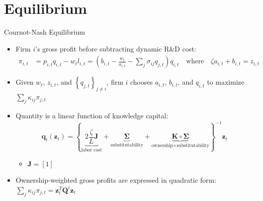 \documentclass[
  aspectratio=169,  %
]{beamer}
\theoremstyle{plain}
\begin{document}
\section{Equilibrium}

\begin{frame}{Cournot-Nash Equilibrium}
  \begin{itemize}
    \item \label{cournot}Firm $i$'s gross profit before subtracting dynamic
          R\&D cost:
          \begin{align*}
            \pi_{i,t} & =p_{i,t}q_{i,t}-w_{t}l_{i,t}=\left(b_{i,t}-\frac{w_{t}}{a_{i,t}}-\sum_{j}\sigma_{ij}q_{j,t}\right)q_{i,t}\quad\text{where}\quad\zeta a_{i,t}+b_{i,t}=z_{i,t}
          \end{align*}
    \item Given $w_{t}$, $z_{i,t}$, and $\left\{ q_{j,t}\right\} _{j\neq i}$,
          firm $i$ chooses $a_{i,t}$, $b_{i,t}$, and $q_{i,t}$ to maximize
          $\sum_{j}\kappa_{ij}\pi_{j,t}$\pause\medskip{}
    \item Quantity is a linear function of knowledge capital:
          \[
            \symbf{q}_{t}(\symbf{z}_{t})=\left\{ \underbrace{2\frac{\zeta}{L}\symbf{J}}_{\text{labor cost}}+\underbrace{\symbf{\Sigma}}_{\text{substitutability}}+\underbrace{\symbf{K}\circ\symbf{\Sigma}}_{\text{ownership}\times\text{substitutability}}\right\} ^{-1}\symbf{z}_{t}
          \]

          \begin{itemize}
            \item $\symbf{J}=[1]$ \medskip{}
          \end{itemize}
    \item Ownership-weighted gross profits are expressed in quadratic form:
          $\sum_{j}\kappa_{ij}\pi_{j,t}=\symbf{z}_{t}^{T}\symbf{Q}^{i}\symbf{z}_{t}$
          \hyperlink{Q}{}
  \end{itemize}
\end{frame}
%
\end{document}
